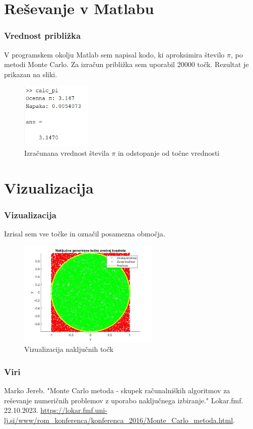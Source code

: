 \documentclass{beamer}
\begin{document}
\section{Reševanje v Matlabu}
\begin{frame}
  \frametitle{Vrednost približka}
  V programskem okolju Matlab sem napisal kodo, ki aproksimira število $\pi$,
  po metodi Monte Carlo. Za izračun približka sem uporabil 20000 točk. Rezultat je prikazan na sliki.
   \begin{figure}
    \centering
    \includegraphics[width=0.3\textwidth]{Izgod.jpg}
    \caption{Izračunana vrednost števila $\pi$ in odstopanje od točne vrednosti}
  \end{figure}
\end{frame}
\section{Vizualizacija}
\begin{frame}
  \frametitle{Vizualizacija}
  Izrisal sem vse točke in označil posamezna območja.
  \begin{figure}
    \centering
    \includegraphics[width=0.6\textwidth]{Graf.jpg}
    \caption{Vizualizacija naključnih točk}
  \end{figure}
\end{frame}
\begin{frame}
  \frametitle{Viri}
  
  \begin{thebibliography}{1} %
     Marko Jereb. "Monte Carlo metoda - skupek računalniških algoritmov za reševanje numeričnih problemov z uporabo naključnega izbiranje." Lokar.fmf. 22.10.2023. \url{https://lokar.fmf.uni-lj.si/www/rom_konferenca/konferenca_2016/Monte_Carlo_metoda.html}.
  \end{thebibliography}
\end{frame}
\end{document}
